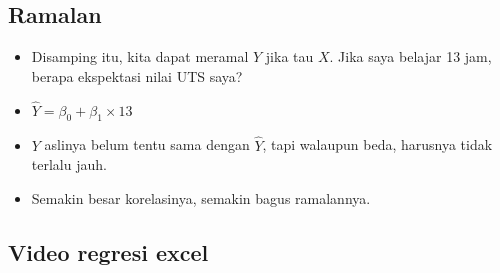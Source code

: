 \documentclass[
  letterpaper,
  DIV=11,
  numbers=noendperiod]{scrartcl}
\begin{document}
\hypertarget{ramalan}{%
\subsection{Ramalan}\label{ramalan}}

\begin{itemize}
\item
  Disamping itu, kita dapat meramal \(Y\) jika tau \(X\). Jika saya
  belajar 13 jam, berapa ekspektasi nilai UTS saya?
\item
  \(\hat{Y}=\beta_0+\beta_1 \times 13\)
\item
  \(Y\) aslinya belum tentu sama dengan \(\hat{Y}\), tapi walaupun beda,
  harusnya tidak terlalu jauh.
\item
  Semakin besar korelasinya, semakin bagus ramalannya.
\end{itemize}

\hypertarget{video-regresi-excel}{%
\subsection{Video regresi excel}\label{video-regresi-excel}}
\end{document}
